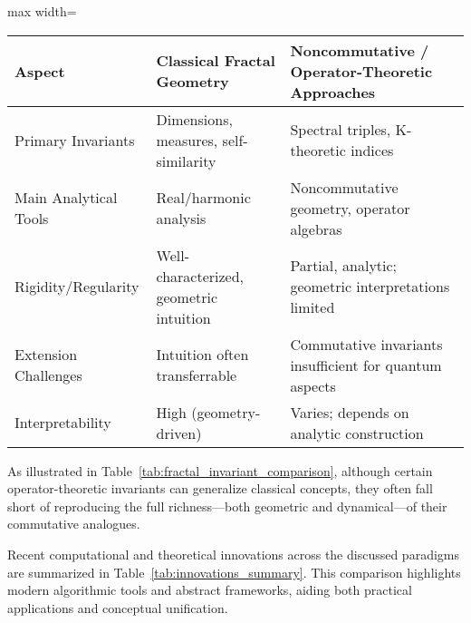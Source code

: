 \documentclass[sigconf]{acmart}
\begin{document}
\begin{table*}[htbp]
\centering
\caption{Comparison of Classical and Noncommutative Fractal Invariants}
\label{tab:fractal_invariant_comparison}
\begin{adjustbox}{max width=\textwidth}
\begin{tabular}{lll}
\toprule
\textbf{Aspect} & \textbf{Classical Fractal Geometry} & \textbf{Noncommutative / Operator-Theoretic Approaches} \\
\midrule
Primary Invariants & Dimensions, measures, self-similarity & Spectral triples, K-theoretic indices \\
Main Analytical Tools & Real/harmonic analysis & Noncommutative geometry, operator algebras \\
Rigidity/Regularity & Well-characterized, geometric intuition & Partial, analytic; geometric interpretations limited \\
Extension Challenges & Intuition often transferrable & Commutative invariants insufficient for quantum aspects \\
Interpretability & High (geometry-driven) & Varies; depends on analytic construction \\
\bottomrule
\end{tabular}
\end{adjustbox}
\end{table*}

As illustrated in Table~\ref{tab:fractal_invariant_comparison}, although certain operator-theoretic invariants can generalize classical concepts, they often fall short of reproducing the full richness—both geometric and dynamical—of their commutative analogues.

\vspace{1em}
Recent computational and theoretical innovations across the discussed paradigms are summarized in Table~\ref{tab:innovations_summary}. This comparison highlights modern algorithmic tools and abstract frameworks, aiding both practical applications and conceptual unification.
\end{document}
